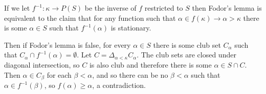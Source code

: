 \documentclass[12pt]{article}
\begin{document}
If we let $f^{-1}:\kappa\rightarrow P(S)$ be the inverse of $f$ restricted to $S$ then Fodor's lemma is equivalent to the claim that for any function such that $\alpha\in f(\kappa)\rightarrow \alpha>\kappa$ there is some $\alpha\in S$ such that $f^{-1}(\alpha)$ is stationary.

Then if Fodor's lemma is false, for every $\alpha\in S$ there is some club set $C_\alpha$ such that $C_\alpha\cap f^{-1}(\alpha)=\emptyset$.  Let $C=\Delta_{\alpha<\kappa} C_\alpha$.  The club sets are closed under diagonal intersection, so $C$ is also club and therefore there is some $\alpha\in S\cap C$.  Then $\alpha\in C_\beta$ for each $\beta<\alpha$, and so there can be no $\beta<\alpha$ such that $\alpha\in f^{-1}(\beta)$, so $f(\alpha)\geq\alpha$, a contradiction.
\end{document}

